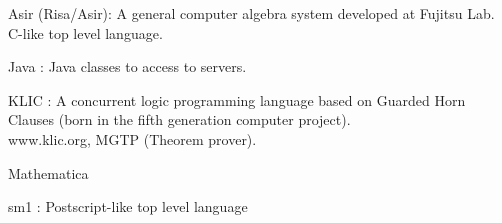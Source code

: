 \documentclass{slides}
\begin{document}

\noindent
{\color{red} Asir} (Risa/Asir):
A general computer algebra system developed at Fujitsu Lab.
C-like top level language.

\noindent
{\color{red} Java} :
Java classes to access to servers.

\noindent
{\color{red} KLIC } :
  A {\color{green} concurrent logic} programming language based
on Guarded Horn Clauses (born in the fifth generation computer project). \\
 {\color{green} www.klic.org}, {\color{red} MGTP} (Theorem prover).

\noindent
{\color{red} Mathematica} 

\noindent
{\color{red} sm1} :
Postscript-like top level language
\end{document}
